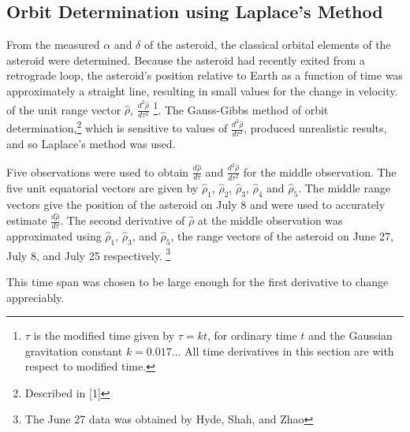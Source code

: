 \documentclass[12pt,journal,compsoc]{IEEEtran}
\begin{document}
\subsection{Orbit Determination using Laplace's Method}
From the measured $\alpha$ and $\delta$ of the asteroid, 
the classical orbital elements of the asteroid were determined. 
Because the asteroid had recently exited from a retrograde loop,
the asteroid's position relative to Earth as a function of time was approximately a straight line,
resulting in small values for the change in velocity.
of the unit range vector $\hat{\rho}$, $\frac{d^2\hat{\rho}}{d\tau^2}$
\footnote{$\tau$ is the modified time given by $\tau=kt$, for ordinary time $t$ 
and the Gaussian gravitation constant $k=0.017...$
All time derivatives in this section are with respect to modified time.}.
The Gauss-Gibbs method of orbit determination,\footnote{Described in [1]} which is
sensitive to values of $\frac{d^2\hat{\rho}}{d\tau^2}$, produced unrealistic results, and so Laplace's method was used.

Five observations were used to obtain $\frac{d\hat{\rho}}{d\tau}$ and $\frac{d^2\hat{\rho}}{d\tau^2}$ 
for the middle observation.
The five unit equatorial vectors are given by $\hat{\rho}_1$, $\hat{\rho}_2$, $\hat{\rho}_3$, $\hat{\rho}_4$ 
and $\hat{\rho}_5$. 
The middle range vectors give the position of the asteroid on July 8 
and were used to accurately estimate $\frac{d\hat{\rho}}{d\tau}$.
The second derivative of $\hat{\rho}$ at the middle observation was approximated 
using $\hat{\rho}_1$, $\hat{\rho}_3$, and $\hat{\rho}_5$, 
the range vectors of the asteroid on June 27, July 8, and July 25 respectively.
\footnote{The June 27 data was obtained by Hyde, Shah, and Zhao} 

This time span was chosen to be large enough for the first derivative to change appreciably.
\end{document}
